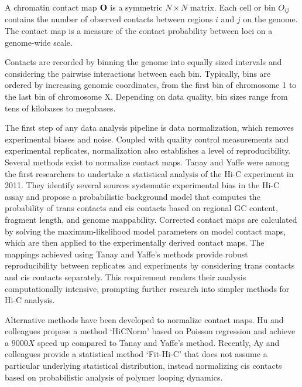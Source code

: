 \begin{defn}
  A chromatin contact map $\mathbf{O}$ is a symmetric $N \times N$ matrix.  Each cell or bin $O_{ij}$ contains the number of observed contacts
  between regions $i$ and $j$ on the genome.  The contact map is a measure of the contact probability between loci on a genome-wide scale.
\end{defn}

Contacts are recorded by binning the genome into equally sized intervals and considering the pairwise interactions between each bin.
Typically, bins are ordered by increasing genomic coordinates, from the first bin of chromosome 1 to the last bin of chromosome X.
Depending on data quality, bin sizes range from tens of kilobases to megabases.

The first step of any data analysis pipeline is data \gls{normalization}, which removes experimental biases and noise.  Coupled with quality
control measurements and experimental replicates, normalization also establishes a level of reproducibility.
Several methods exist to normalize contact maps.  Tanay and Yaffe were among the first researchers to undertake a statistical analysis of the
Hi-C experiment in 2011\cite{yaffe2011}.  They identify several sources systematic experimental bias in the Hi-C assay and propose a
probabilistic background model that computes the probability of \glspl{trans contact} and \glspl{cis contact} based on regional
\gls{GC} content, fragment length, and genome mappability.  Corrected contact maps are calculated by solving the maximum-likelihood model
parameters on model contact maps, which are then applied to the experimentally derived contact maps.  The mappings
achieved using Tanay and Yaffe's methods provide robust reproducibility between replicates and experiments by considering
\glspl{trans contact} and \glspl{cis contact} separately\cite{yaffe2011}.  This requirement renders their analysis computationally
intensive, prompting further research into simpler methods for Hi-C analysis.

Alternative methods have been developed to normalize contact maps.  Hu and colleagues propose a method `HiCNorm' based on Poisson
regression and achieve a $9000X$ speed up compared to Tanay and Yaffe's method\cite{hu2012}.  Recently, Ay and colleagues provide a statistical
method `Fit-Hi-C' that does not assume a particular underlying statistical distribution, instead normalizing \glspl{cis contact} based on probabilistic
analysis of polymer looping dynamics\cite{ay2014}.

